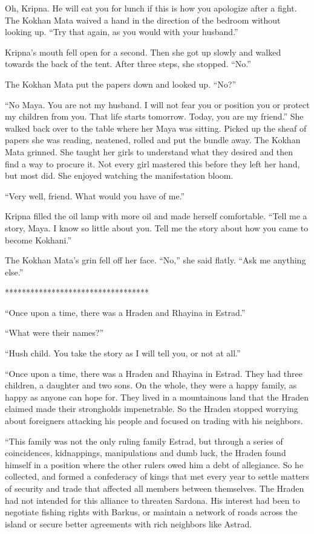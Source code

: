 \documentclass{article}
\begin{document}
	Oh, Kripna. He will eat you for lunch if this is how you apologize after a fight. The Kokhan Mata waived a hand in the direction of the bedroom without looking up. “Try that again, as you would with your husband.”
	
	Kripna’s mouth fell open for a second. Then she got up slowly and walked towards the back of the tent. After three steps, she stopped. “No.”
	
	The Kokhan Mata put the papers down and looked up. “No?”
	
	“No Maya. You are not my husband. I will not fear you or position you or protect my children from you. That life starts tomorrow. Today, you are my friend.” She walked back over to the table where her Maya was sitting. Picked up the sheaf of papers she was reading, neatened, rolled and put the bundle away. The Kokhan Mata grinned. She taught her girls to understand what they desired and then find a way to procure it. Not every girl mastered this before they left her hand, but most did. She enjoyed watching the manifestation bloom.
	
	“Very well, friend. What would you have of me.”
	
	Kripna filled the oil lamp with more oil and made herself comfortable. “Tell me a story, Maya. I know so little about you. Tell me the story about how you came to become Kokhani.”
	
	The Kokhan Mata’s grin fell off her face. “No,” she said flatly. “Ask me anything else.”
	
	**********************************
	
	“Once upon a time, there was a Hraden and Rhayina in Estrad.” 
	
	“What were their names?”
	
	“Hush child. You take the story as I will tell you, or not at all.”
	
	“Once upon a time, there was a Hraden and Rhayina in Estrad. They had three children, a daughter and two sons. On the whole, they were a happy family, as happy as anyone can hope for. They lived in a mountainous land that the Hraden claimed made their strongholds impenetrable. So the Hraden stopped worrying about foreigners attacking his people and focused on trading with his neighbors.
	
	“This family was not the only ruling family Estrad, but through a series of coincidences, kidnappings, manipulations and dumb luck, the Hraden found himself in a position where the other rulers owed him a debt of allegiance. So he collected, and formed a confederacy of kings that met every year to settle matters of security and trade that affected all members between themselves. The Hraden had not intended for this alliance to threaten Sardona. His interest had been to negotiate fishing rights with Barkus, or maintain a network of roads across the island or secure better agreements with rich neighbors like Astrad.
	
\end{document}
